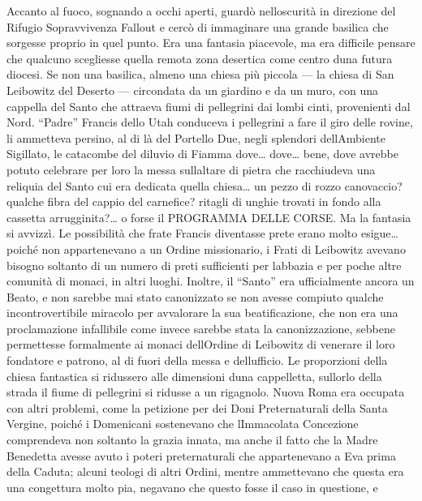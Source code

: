 Accanto al fuoco, sognando a occhi aperti, guardò
nell\textquotesingle oscurità in direzione del Rifugio Sopravvivenza
Fallout e cercò di immaginare una grande basilica che sorgesse proprio
in quel punto. Era una fantasia piacevole, ma era difficile pensare che
qualcuno scegliesse quella remota zona desertica come centro
d\textquotesingle una futura diocesi. Se non una basilica, almeno una
chiesa più piccola --- la chiesa di San Leibowitz del Deserto ---
circondata da un giardino e da un muro, con una cappella del Santo che
attraeva fiumi di pellegrini dai lombi cinti, provenienti dal Nord.
``Padre'' Francis dello Utah conduceva i pellegrini a fare il giro delle
rovine, li ammetteva persino, al di là del Portello Due, negli splendori
dell\textquotesingle Ambiente Sigillato, le catacombe del diluvio di
Fiamma dove\ldots{} dove\ldots{} bene, dove avrebbe potuto celebrare per
loro la messa sull\textquotesingle altare di pietra che racchiudeva una
reliquia del Santo cui era dedicata quella chiesa\ldots{} un pezzo di
rozzo canovaccio? qualche fibra del cappio del carnefice? ritagli di
unghie trovati in fondo alla cassetta arrugginita?\ldots{} o forse il
PROGRAMMA DELLE CORSE. Ma la fantasia si avvizzì. Le possibilità che
frate Francis diventasse prete erano molto esigue\ldots{} poiché non
appartenevano a un Ordine missionario, i Frati di Leibowitz avevano
bisogno soltanto di un numero di preti sufficienti per
l\textquotesingle abbazia e per poche altre comunità di monaci, in altri
luoghi. Inoltre, il ``Santo'' era ufficialmente ancora un Beato, e non
sarebbe mai stato canonizzato se non avesse compiuto qualche
incontrovertibile miracolo per avvalorare la sua beatificazione, che non
era una proclamazione infallibile come invece sarebbe stata la
canonizzazione, sebbene permettesse formalmente ai monaci
dell\textquotesingle Ordine di Leibowitz di venerare il loro fondatore e
patrono, al di fuori della messa e dell\textquotesingle ufficio. Le
proporzioni della chiesa fantastica si ridussero alle dimensioni
d\textquotesingle una cappelletta, sull\textquotesingle orlo della
strada il fiume di pellegrini si ridusse a un rigagnolo. Nuova Roma era
occupata con altri problemi, come la petizione per dei Doni
Preternaturali della Santa Vergine, poiché i Domenicani sostenevano che
l\textquotesingle Immacolata Concezione comprendeva non soltanto la
grazia innata, ma anche il fatto che la Madre Benedetta avesse avuto i
poteri preternaturali che appartenevano a Eva prima della Caduta; alcuni
teologi di altri Ordini, mentre ammettevano che questa era una
congettura molto pia, negavano che questo fosse il caso in questione, e
